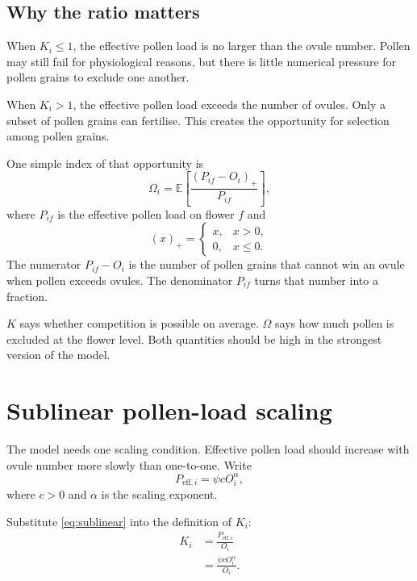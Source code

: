 \documentclass[12pt]{article}
\newcommand{\E}{\mathbb{E}}
\begin{document}
\subsection{Why the ratio matters}

When $K_i \leq 1$, the effective pollen load is no larger than the ovule number. Pollen may still fail for physiological reasons, but there is little numerical pressure for pollen grains to exclude one another.

When $K_i>1$, the effective pollen load exceeds the number of ovules. Only a subset of pollen grains can fertilise. This creates the opportunity for selection among pollen grains.

One simple index of that opportunity is
\begin{equation}
\Omega_i=
\E\left[\frac{(P_{if}-O_i)_+}{P_{if}}\right],
\label{eq:Omega}
\end{equation}
where $P_{if}$ is the effective pollen load on flower $f$ and
\begin{equation}
(x)_+=\begin{cases}
x, & x>0,\\
0, & x\leq 0.
\end{cases}
\end{equation}
The numerator $P_{if}-O_i$ is the number of pollen grains that cannot win an ovule when pollen exceeds ovules. The denominator $P_{if}$ turns that number into a fraction.

\begin{conclusionbox}
$K$ says whether competition is possible on average. $\Omega$ says how much pollen is excluded at the flower level. Both quantities should be high in the strongest version of the model.
\end{conclusionbox}

\section{Sublinear pollen-load scaling}

The model needs one scaling condition. Effective pollen load should increase with ovule number more slowly than one-to-one. Write
\begin{equation}
P_{\mathrm{eff},i} = \psi c O_i^\alpha,
\label{eq:sublinear}
\end{equation}
where $c>0$ and $\alpha$ is the scaling exponent.

Substitute \eqref{eq:sublinear} into the definition of $K_i$:
\begin{align}
K_i
&=\frac{P_{\mathrm{eff},i}}{O_i} \\
&=\frac{\psi c O_i^\alpha}{O_i}. 
\end{align}
\end{document}
